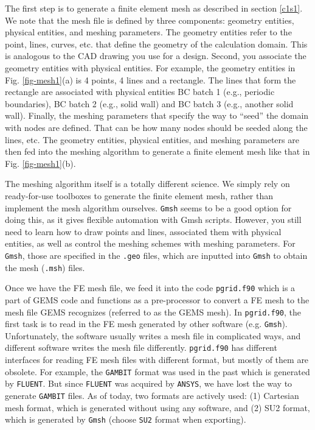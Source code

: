 \documentclass[11pt, letterpaper]{report}
\begin{document}
The first step is to generate a finite element mesh as described in section \ref{c1s1}. We note that
the mesh file is defined by three components: geometry entities, physical entities, and meshing
parameters. The geometry entities refer to the point, lines, curves, etc. that define the geometry
of the calculation domain. This is analogous to the CAD drawing you use for a design. Second, you
associate the geometry entities with physical entities. For example, the geometry entities in Fig.
\ref{fig-mesh1}(a) is 4 points, 4 lines and a rectangle. The lines that form the rectangle are
associated with physical entities BC batch 1 (e.g., periodic boundaries), BC batch 2 (e.g., solid
wall) and BC batch 3 (e.g., another solid wall). Finally, the meshing parameters that specify the
way to ``seed'' the domain with nodes are defined. That can be how many nodes should be seeded along
the lines, etc. The geometry entities, physical entities, and meshing parameters are then fed into
the meshing algorithm to generate a finite element mesh like that in Fig. \ref{fig-mesh1}(b).
\paraspace

The meshing algorithm itself is a totally different science. We simply rely on ready-for-use
toolboxes to generate the finite element mesh, rather than implement the mesh algorithm ourselves.
\verb+Gmsh+ seems to be a good option for doing this, as it gives flexible automation with Gmsh
scripts. However, you still need to learn how to draw points and lines, associated them with physical
entities, as well as control the meshing schemes with meshing parameters. For \verb+Gmsh+, those are
specified in the \verb+.geo+ files, which are inputted into \verb+Gmsh+ to obtain the mesh
(\verb+.msh+) files.
\paraspace

Once we have the FE mesh file, we feed it into the code \verb+pgrid.f90+ which is a part of GEMS
code and functions as a pre-processor to convert a FE mesh to the mesh file GEMS recognizes
(referred to as the GEMS mesh). In \verb+pgrid.f90+, the first task is to read in the FE mesh
generated by other software (e.g. \verb+Gmsh+). Unfortunately, the software usually writes a mesh
file in complicated ways, and different software writes the mesh file differently. \verb+pgrid.f90+
has different interfaces for reading FE mesh files with different format, but mostly of them are
obsolete. For example, the \verb+GAMBIT+ format was used in the past which is generated by
\verb+FLUENT+. But since \verb+FLUENT+ was acquired by \verb+ANSYS+, we have lost the way to
generate \verb+GAMBIT+ files.  As of today, two formats are actively used: (1) Cartesian mesh
format, which is generated without using any software, and (2) SU2 format, which is generated by
\verb+Gmsh+ (choose \verb+SU2+ format when exporting).  \paraspace
\end{document}
